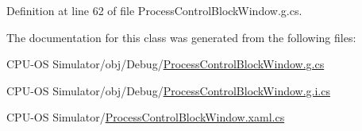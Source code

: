 Definition at line 62 of file Process\+Control\+Block\+Window.\+g.\+cs.



The documentation for this class was generated from the following files\+:\begin{DoxyCompactItemize}
\item 
C\+P\+U-\/\+O\+S Simulator/obj/\+Debug/\hyperlink{_process_control_block_window_8g_8cs}{Process\+Control\+Block\+Window.\+g.\+cs}\item 
C\+P\+U-\/\+O\+S Simulator/obj/\+Debug/\hyperlink{_process_control_block_window_8g_8i_8cs}{Process\+Control\+Block\+Window.\+g.\+i.\+cs}\item 
C\+P\+U-\/\+O\+S Simulator/\hyperlink{_process_control_block_window_8xaml_8cs}{Process\+Control\+Block\+Window.\+xaml.\+cs}\end{DoxyCompactItemize}

